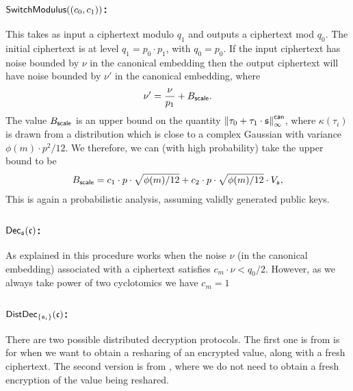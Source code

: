 \subsubsection{$\mathsf{SwitchModulus}((c_0,c_1))$:}
This takes as input a ciphertext modulo $q_1$ and outputs a ciphertext mod $q_0$.
The initial ciphertext is at level $q_1=p_0 \cdot p_1$, with $q_0=p_0$.
If the input ciphertext has noise bounded by $\nu$
in the canonical embedding
then the output ciphertext will have noise bounded by $\nu'$ in
the canonical embedding, where
\[ \nu' = \frac{\nu}{p_1} + B_{\mathsf{scale}}. \]
The value $B_{\mathsf{scale}}$ is an upper bound on the quantity
${\Vert \tau_0+\tau_1 \cdot \mathfrak{s} \Vert}_\infty^{\mathsf{can}}$, where
$\kappa(\tau_i)$ is drawn from a distribution
which is close to a complex Gaussian with variance $\phi(m)\cdot p^2/12$.
We therefore, we can (with high probability) take the upper
bound to be
\begin{align*}
    B_{\mathsf{scale}} 
	&= c_1 \cdot p \cdot \sqrt{ \phi(m)/12}
	+  c_2 \cdot p \cdot \sqrt{ \phi(m)/12} \cdot V_{\mathfrak{s}}, \\
\end{align*}
This is again a probabilistic analysis, assuming validly generated
public keys.

\subsubsection{$\mathsf{Dec}_{\mathfrak{s}}(\mathfrak{c})$:}
As explained in \cite{SPDZ2,GHS12c} this procedure works when the noise 
$\nu$ (in the canonical embedding) associated with a ciphertext satisfies $c_m \cdot \nu  < q_{0}/2$.
However, as we always take power of two cyclotomics we have $c_m=1$

\subsubsection{$\mathsf{DistDec}_{\{\mathfrak{s}_i\}}(\mathfrak{c})$:}
There are two possible distributed decryption protocols.
The first one is from \cite{SPDZ} is for when we want to obtain a
resharing of an encrypted value, along with a fresh ciphertext.
The second version is from \cite{KPR}, where we do not need to
obtain a fresh encryption of the value being reshared.


